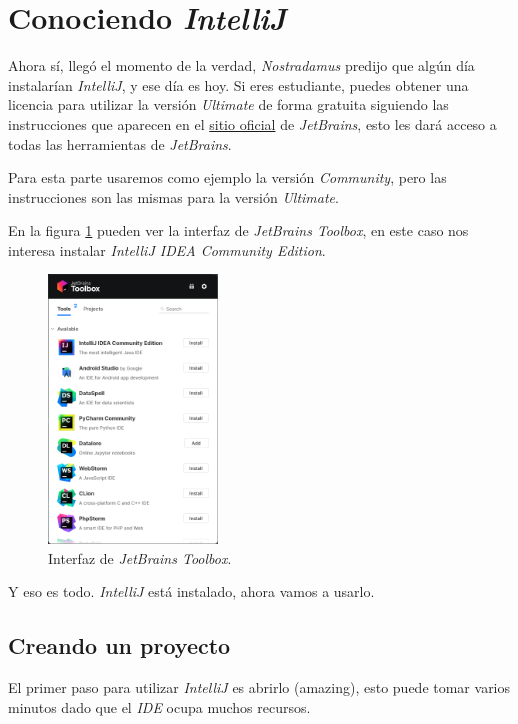 \section{Conociendo \textit{IntelliJ}}
  Ahora sí, llegó el momento de la verdad, \textit{Nostradamus} predijo que algún día instalarían
  \textit{IntelliJ}, y ese día es hoy.
  Si eres estudiante, puedes obtener una licencia para utilizar la versión \textit{Ultimate} de
  forma gratuita siguiendo las instrucciones que aparecen en el 
  \href{https://www.jetbrains.com/community/education/#students}{sitio oficial} de 
  \textit{JetBrains}, esto les dará acceso a todas las herramientas de \textit{JetBrains}.

  Para esta parte usaremos como ejemplo la versión \textit{Community}, pero las instrucciones son
  las mismas para la versión \textit{Ultimate}.

  En la figura \ref{fig:jb-toolbox} pueden ver la interfaz de \textit{JetBrains Toolbox}, en este
  caso nos interesa instalar \textit{IntelliJ IDEA Community Edition}.

  \begin{figure}[ht!]
    \centering
    \includegraphics[width=0.4\textwidth]{img/Por_algo_se_empieza/jetbrains-toolbox.png}
    \caption{Interfaz de \textit{JetBrains Toolbox}.}
    \label{fig:jb-toolbox}
  \end{figure}

  Y eso es todo.
  \textit{IntelliJ} está instalado, ahora vamos a usarlo.

  \subsection{Creando un proyecto}
    El primer paso para utilizar \textit{IntelliJ} es abrirlo (amazing), esto puede tomar varios 
    minutos dado que el \textit{IDE} ocupa muchos recursos.


